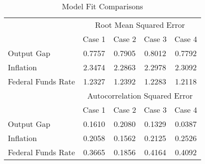 \begin{table}
\caption{Model Fit Comparisons}\label{tb:rmse}
\begin{center}
\begin{tabular}{|l|cccc|}\hline
 & \multicolumn{4}{|c|}{Root Mean Squared Error} \\ 
 & Case 1 & Case 2 & Case 3 & Case 4 \\ \hline
Output Gap & 0.7757 & 0.7905 & 0.8012 & 0.7792 \\ 
Inflation & 2.3474 & 2.2863 & 2.2978 & 2.3092 \\ 
Federal Funds Rate & 1.2327 & 1.2392 & 1.2283 & 1.2118 \\ \hline 
 & \multicolumn{4}{|c|}{Autocorrelation Squared Error} \\ 
 & Case 1 & Case 2 & Case 3 & Case 4 \\ \hline
Output Gap & 0.1610 & 0.2080 & 0.1329 & 0.0387 \\ 
Inflation & 0.2058 & 0.1562 & 0.2125 & 0.2526 \\ 
Federal Funds Rate & 0.3665 & 0.1856 & 0.4164 & 0.4092 \\ \hline 
\end{tabular}
\end{center}
\end{table}

